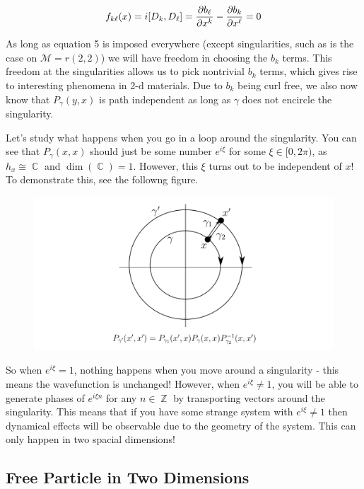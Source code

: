 \documentclass{article}
\DeclareMathOperator{\ZZ}{\mathbb{Z}}
\DeclareMathOperator{\CC}{\mathbb{C}}
\begin{document}
\begin{equation}
f_{k\ell}(x) = i[D_k,D_\ell] = \pdv{b_\ell}{x^k} - \pdv{b_k}{x^\ell}=0
\end{equation}

As long as equation 5 is imposed everywhere (except singularities, such as is the case on $\mathcal{M}=r(2,2)$) we will have freedom in choosing the $b_k$ terms. This freedom at the singularities allows us to pick nontrivial $b_k$ terms, which gives rise to interesting phenomena in 2-d materials. Due to $b_k$ being curl free, we also now know that $P_\gamma(y,x)$ is path independent as long as $\gamma$ does not encircle the singularity.

Let's study what happens when you go in a loop around the singularity. You can see that $P_\gamma(x,x)$ should just be some number $e^{i\xi}$ for some $\xi \in [0,2\pi)$, as $h_x \cong \CC$ and $\dim(\CC)=1$. However, this $\xi$ turns out to be independent of $x$! To demonstrate this, see the followng figure. 

\pagebreak

\begin{figure}[ht]
    \centering
    \includegraphics[width=\linewidth]{Figures/path_independence_gauge.png}
    \caption*{}
    \label{fig:31}
\end{figure}

So when $e^{i\xi}=1$, nothing happens when you move around a singularity - this means the wavefunction is unchanged! However, when $e^{i\xi}\neq 1$, you will be able to generate phases of $e^{i\xi n}$ for any $n \in \ZZ$ by transporting vectors around the singularity. This means that if you have some strange system with $e^{i\xi}\neq 1$ then dynamical effects will be observable due to the geometry of the system. This can only happen in two spacial dimensions!

\subsection{Free Particle in Two Dimensions}
\end{document}
